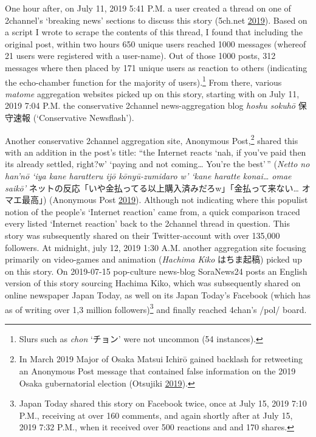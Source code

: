\documentclass[10pt,british,A4paper,,openany]{memoir}
\begin{document}
One hour after, on July 11, 2019 5:41 P.M. a user created a thread on
one of 2channel's `breaking news' sections to discuss this story
(5ch.net \protect\hyperlink{ref-5ch.net_eng._2019}{2019}). Based on a
script I wrote to scrape the contents of this thread, I found that
including the original post, within two hours 650 unique users reached
1000 messages (whereof 21 users were registered with a user-name). Out
of those 1000 posts, 312 messages where then placed by 171 unique users
as reaction to others (indicating the echo-chamber function for the
majority of users).\footnote{Slurs such as \emph{chon} `チョン' were not
  uncommon (54 instances).} From there, various \emph{matome}
aggregation websites picked up on this story, starting with on July 11,
2019 7:04 P.M. the conservative 2channel news-aggregation blog
\emph{hoshu sokuhō} 保守速報 (`Conservative Newsflash').

Another conservative 2channel aggregation site, Anonymous
Post,\footnote{In March 2019 Major of Osaka Matsui Ichirō gained
  backlash for retweeting an Anonymous Post message that contained false
  information on the 2019 Osaka gubernatorial election (Otsujiki
  \protect\hyperlink{ref-otsujiki_eng._2019}{2019}).} shared this with
an addition in the post's title: ``the Internet reacts `nah, if you've
paid then its already settled, right?w' `paying and not coming\ldots{}
You're the best'\,'' (\emph{Netto no han'nō `iya kane haratteru ijō
kōnyū-zumidaro w' `kane haratte konai\ldots{} omae saikō'}
ネットの反応「いや金払ってる以上購入済みだろw」「金払って来ない\ldots{}
オマエ最高」) (Anonymous Post
\protect\hyperlink{ref-anonymous_post_eng._2019}{2019}). Although not
indicating where this populist notion of the people's `Internet
reaction' came from, a quick comparison traced every listed `Internet
reaction' back to the 2channel thread in question. This story was
subsequently shared on their Twitter-account with over 135,000
followers. At midnight, july 12, 2019 1:30 A.M. another aggregation site
focusing primarily on video-games and animation (\emph{Hachima Kiko}
はちま起稿) picked up on this story. On 2019-07-15 pop-culture news-blog
SoraNews24 posts an English version of this story sourcing Hachima Kiko,
which was subsequently shared on online newspaper Japan Today, as well
on its Japan Today's Facebook (which has as of writing over 1,3 million
followers)\footnote{Japan Today shared this story on Facebook twice,
  once at July 15, 2019 7:10 P.M., receiving at over 160 comments, and
  again shortly after at July 15, 2019 7:32 P.M., when it received over
  500 reactions and and 170 shares.} and finally reached 4chan's /pol/
board.
\end{document}
